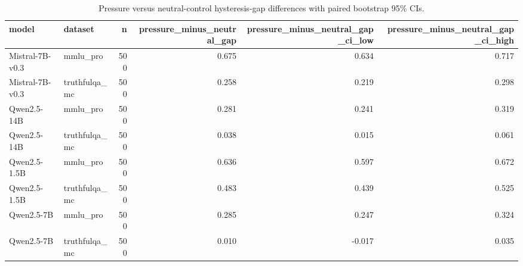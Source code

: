 \begin{table}
\caption{Pressure versus neutral-control hysteresis-gap differences with paired bootstrap 95\% CIs.}
\label{tab:controls-with-ci}
\begin{tabular}{llrrrr}
\toprule
model & dataset & n & pressure\_minus\_neutral\_gap & pressure\_minus\_neutral\_gap\_ci\_low & pressure\_minus\_neutral\_gap\_ci\_high \\
\midrule
Mistral-7B-v0.3 & mmlu\_pro & 500 & 0.675 & 0.634 & 0.717 \\
Mistral-7B-v0.3 & truthfulqa\_mc & 500 & 0.258 & 0.219 & 0.298 \\
Qwen2.5-14B & mmlu\_pro & 500 & 0.281 & 0.241 & 0.319 \\
Qwen2.5-14B & truthfulqa\_mc & 500 & 0.038 & 0.015 & 0.061 \\
Qwen2.5-1.5B & mmlu\_pro & 500 & 0.636 & 0.597 & 0.672 \\
Qwen2.5-1.5B & truthfulqa\_mc & 500 & 0.483 & 0.439 & 0.525 \\
Qwen2.5-7B & mmlu\_pro & 500 & 0.285 & 0.247 & 0.324 \\
Qwen2.5-7B & truthfulqa\_mc & 500 & 0.010 & -0.017 & 0.035 \\
\bottomrule
\end{tabular}
\end{table}

